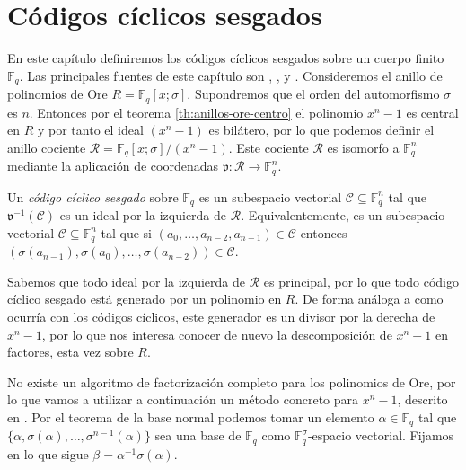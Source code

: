 \chapter{Códigos cíclicos sesgados}

En este capítulo definiremos los códigos cíclicos sesgados sobre un cuerpo finito \(\mathbb F_q\).
Las principales fuentes de este capítulo son \parencite{gomez-torrecillas_new_2016}, \parencite{gomez-torrecillas_petersongorensteinzierler_2018}, \parencite{shi_codes_2017} y \parencite{lam_vandermonde_1988}.
Consideremos el anillo de polinomios de Ore \(R = \mathbb F_q[x; \sigma]\).
Supondremos que el orden del automorfismo \(\sigma\) es \(n\).
Entonces por el teorema \ref{th:anillos-ore-centro} el polinomio \(x^n - 1\) es central en \(R\) y por tanto el ideal \((x^n - 1)\) es bilátero, por lo que podemos definir el anillo cociente \(\mathcal R = \mathbb F_q[x; \sigma]/(x^n - 1)\).
Este cociente \(\mathcal R\) es isomorfo a \(\mathbb F_q^n\) mediante la aplicación de coordenadas \(\mathfrak v : \mathcal R \to \mathbb F_q^n\).

\begin{definition}
  Un \emph{código cíclico sesgado} sobre \(\mathbb F_q\) es un subespacio vectorial \(\mathcal C \subseteq \mathbb F_q^n\) tal que \(\mathfrak v^{-1}(\mathcal C)\) es un ideal por la izquierda de \(\mathcal R\).
  Equivalentemente, es un subespacio vectorial \(\mathcal C \subseteq \mathbb F_q^n\) tal que si \((a_0, \dots, a_{n-2}, a_{n-1}) \in \mathcal C\) entonces \((\sigma(a_{n-1}), \sigma(a_0), \dots, \sigma(a_{n-2})) \in \mathcal C\).
\end{definition}


Sabemos que todo ideal por la izquierda de \(\mathcal R\) es principal, por lo que todo código cíclico sesgado está generado por un polinomio en \(R\).
De forma análoga a como ocurría con los códigos cíclicos, este generador es un divisor por la derecha de \(x^n - 1\), por lo que nos interesa conocer de nuevo la descomposición de \(x^n - 1\) en factores, esta vez sobre \(R\).

No existe un algoritmo de factorización completo para los polinomios de Ore, por lo que vamos a utilizar a continuación un método concreto para \(x^n - 1\), descrito en \parencite{gomez-torrecillas_new_2016}.
Por el teorema de la base normal podemos tomar un elemento \(\alpha \in \mathbb F_q\) tal que \(\{\alpha, \sigma(\alpha), \dots, \sigma^{n-1}(\alpha)\}\) sea una base de  \(\mathbb F_q\) como \(\mathbb F_q^{\sigma}\)-espacio vectorial.
Fijamos en lo que sigue \(\beta = \alpha^{-1}\sigma(\alpha)\).

